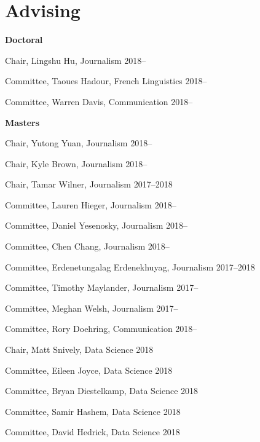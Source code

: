 
\section{Advising}

  \textbf{Doctoral}
    \begin{innerlist}
      \item Chair, Lingshu Hu, Journalism                            \hfill 2018--
      \item Committee, Taoues Hadour, French Linguistics             \hfill 2018--
      \item Committee, Warren Davis, Communication                   \hfill 2018--
    \end{innerlist}\vspace{1em}

  \textbf{Masters}
    \begin{innerlist}
      \item Chair, Yutong Yuan, Journalism                           \hfill 2018--
      \item Chair, Kyle Brown, Journalism                            \hfill 2018--
      \item Chair, Tamar Wilner, Journalism                          \hfill 2017--2018
      \item Committee, Lauren Hieger, Journalism                     \hfill 2018--
      \item Committee, Daniel Yesenosky, Journalism                  \hfill 2018--
      \item Committee, Chen Chang, Journalism                        \hfill 2018--
      \item Committee, Erdenetungalag Erdenekhuyag, Journalism       \hfill 2017--2018
      \item Committee, Timothy Maylander, Journalism                 \hfill 2017--
      \item Committee, Meghan Welsh, Journalism                      \hfill 2017--
      \item Committee, Rory Doehring, Communication                  \hfill 2018--
      \item Chair, Matt Snively, Data Science                        \hfill 2018
      \item Committee, Eileen Joyce, Data Science                    \hfill 2018
      \item Committee, Bryan Diestelkamp, Data Science               \hfill 2018
      \item Committee, Samir Hashem, Data Science                    \hfill 2018
      \item Committee, David Hedrick, Data Science                   \hfill 2018
    \end{innerlist}\vspace{-.1in}
